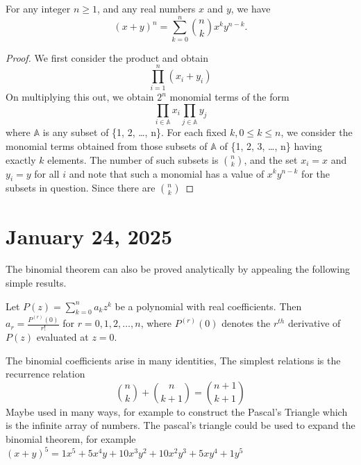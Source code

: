 \documentclass[11pt]{article}
\begin{document}
\begin{theorem}\label{1.22}
    For any integer \(n \geqslant 1\), and any real numbers \(x\) and \(y\), we have
    \[
        (x + y)^n = \sum_{k = 0}^{n} \binom{n}{k} x^k y^{n - k}.
    \]
\end{theorem}
\begin{proof}
    We first consider the product and obtain
    \[\prod_{ i = 1}^{n} (x_i + y_i)\]
    On multiplying this out, we obtain \(2^n\) monomial terms of the form
    \[
        \prod_{i \in \mathbb{A}} x_i \prod_{j \in \mathbb{A}} y_j
    \]
    where \(\mathbb{A}\) is any subset of \{1, 2, \ldots, n\}. For each fixed \(k,
    0 \leqslant k \leqslant n\), we consider the monomial terms obtained from those
    subsets of \(\mathbb{A}\) of \{1, 2, 3, \ldots, n\} having exactly \(k\)
    elements. The number of such subsets is \(\binom{n}{k}\), and the set \(x_i =
    x\) and \(y_i = y\) for all \(i\) and note that such a monomial has a value of
    \(x^k y^{n - k}\) for the subsets in question. Since there are \(\binom{n}{k}\)
\end{proof}
\section{January 24, 2025}
The binomial theorem can also be proved analytically by appealing the following
simple results.
\begin{lemma}\label{1.23}
    Let \(P(z) = \sum_{k = 0}^{n} a_k z^k\) be a polynomial with real coefficients. Then \(a_r = \frac{P^{(r)}(0)}{r!}\) for \(r = 0, 1, 2, \ldots, n\), where \(P^{(r)}(0)\) denotes the \(r^{th}\) derivative of \(P(z)\) evaluated at \(z = 0\).
\end{lemma}

The binomial coefficients arise in many identities, The simplest relations is
the recurrence relation
\[
    \binom{n}{k} + \binom{n}{k + 1} = \binom{n + 1}{k + 1}
\]
Maybe used in many ways, for example to construct the Pascal's Triangle which
is the infinite array of numbers. The pascal's triangle could be used to expand
the binomial theorem, for example \({(x + y)}^5 = 1x^5 + 5x^4y + 10x^3y^2 +
10x^2y^3 + 5xy^4 + 1y^5\) \\
\begin{center}
\end{center}
\end{document}
